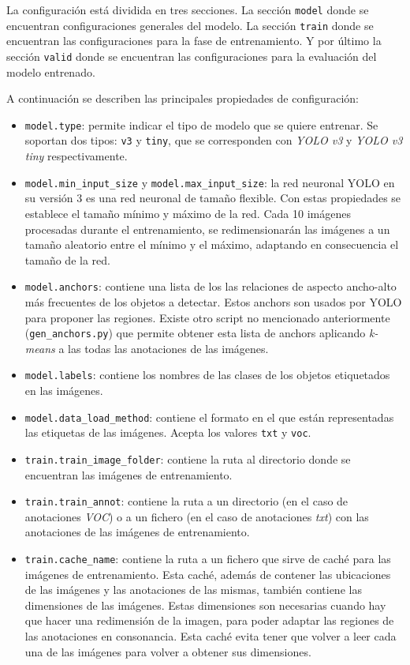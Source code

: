 La configuración está dividida en tres secciones. La sección \texttt{model} donde se encuentran configuraciones generales del modelo. La sección \texttt{train} donde se encuentran las configuraciones para la fase de entrenamiento. Y por último la sección \texttt{valid} donde se encuentran las configuraciones para la evaluación del modelo entrenado.

A continuación se describen las principales propiedades de configuración:

\begin{itemize}
	\item \texttt{model.type}: permite indicar el tipo de modelo que se quiere entrenar. Se soportan dos tipos: \texttt{v3} y \texttt{tiny}, que se corresponden con \textit{YOLO v3} y \textit{YOLO v3 tiny} respectivamente.
	\item \texttt{model.min\_input\_size} y \texttt{model.max\_input\_size}: la red neuronal YOLO en su versión 3 es una red neuronal de tamaño flexible. Con estas propiedades se establece el tamaño mínimo y máximo de la red. Cada 10 imágenes procesadas durante el entrenamiento, se redimensionarán las imágenes a un tamaño aleatorio entre el mínimo y el máximo, adaptando en consecuencia el tamaño de la red.
	\item \texttt{model.anchors}: contiene una lista de los las relaciones de aspecto ancho-alto más frecuentes de los objetos a detectar. Estos anchors son usados por YOLO para proponer las regiones. Existe otro script no mencionado anteriormente (\texttt{gen\_anchors.py}) que permite obtener esta lista de anchors aplicando \textit{k-means} a las todas las anotaciones de las imágenes.
	\item \texttt{model.labels}: contiene los nombres de las clases de los objetos etiquetados en las imágenes.
	\item \texttt{model.data\_load\_method}: contiene el formato en el que están representadas las etiquetas de las imágenes. Acepta los valores \texttt{txt} y \texttt{voc}.
	\item \texttt{train.train\_image\_folder}: contiene la ruta al directorio donde se encuentran las imágenes de entrenamiento.
	\item \texttt{train.train\_annot}: contiene la ruta a un directorio (en el caso de anotaciones \textit{VOC}) o a un fichero (en el caso de anotaciones \textit{txt}) con las anotaciones de las imágenes de entrenamiento.
	\item \texttt{train.cache\_name}: contiene la ruta a un fichero que sirve de caché para las imágenes de entrenamiento. Esta caché, además de contener las ubicaciones de las imágenes y las anotaciones de las mismas, también contiene las dimensiones de las imágenes. Estas dimensiones son necesarias cuando hay que hacer una redimensión de la imagen, para poder adaptar las regiones de las anotaciones en consonancia. Esta caché evita tener que volver a leer cada una de las imágenes para volver a obtener sus dimensiones.

\end{itemize}
